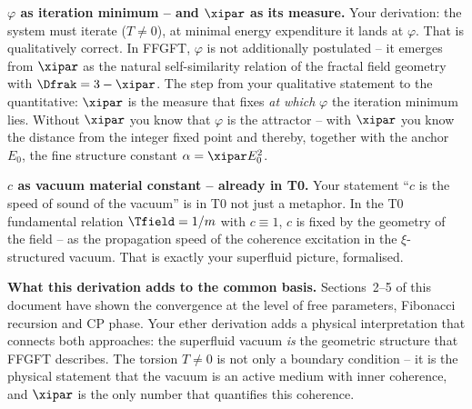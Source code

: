 \begin{response}
\medskip
\textbf{$\varphi$ as iteration minimum -- and $\xipar$ as its measure.}
Your derivation: the system must iterate ($T \neq 0$), at minimal energy expenditure it lands at $\varphi$. That is qualitatively correct. In FFGFT, $\varphi$ is not additionally postulated -- it emerges from $\xipar$ as the natural self-similarity relation of the fractal field geometry with $\Dfrak = 3 - \xipar$. The step from your qualitative statement to the quantitative: $\xipar$ is the measure that fixes \emph{at which} $\varphi$ the iteration minimum lies. Without $\xipar$ you know that $\varphi$ is the attractor -- with $\xipar$ you know the distance from the integer fixed point and thereby, together with the anchor $E_0$, the fine structure constant $\alpha = \xipar E_0^2$.

\medskip
\textbf{$c$ as vacuum material constant -- already in T0.}
Your statement ``$c$ is the speed of sound of the vacuum'' is in T0 not just a metaphor. In the T0 fundamental relation $\Tfield = 1/m$ with $c \equiv 1$, $c$ is fixed by the geometry of the field -- as the propagation speed of the coherence excitation in the $\xi$-structured vacuum. That is exactly your superfluid picture, formalised.

\medskip
\textbf{What this derivation adds to the common basis.}
Sections~2--5 of this document have shown the convergence at the level of free parameters, Fibonacci recursion and CP phase. Your ether derivation adds a physical interpretation that connects both approaches: the superfluid vacuum \emph{is} the geometric structure that FFGFT describes. The torsion $T \neq 0$ is not only a boundary condition -- it is the physical statement that the vacuum is an active medium with inner coherence, and $\xipar$ is the only number that quantifies this coherence.

\begin{center}
\end{center}
\end{response}

